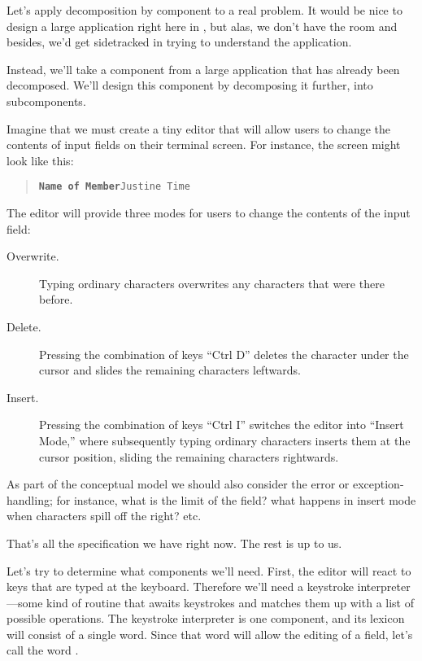 Let's apply decomposition by component to a real problem. It would be
nice to design a large application right here in , but alas, we
don't have the room and besides, we'd get sidetracked in trying to
understand the application.

Instead, we'll take a component from a large application that has
already been decomposed. We'll design this component by decomposing it
further, into subcomponents.

Imagine that we must create a tiny editor that will allow users to
change the contents of input fields on their terminal screen. For instance,
the screen might look like this:

\begin{quote}
\texttt{\textbf{Name of Member}\hspace{4em}Justine Time}
\end{quote}

The editor will provide three modes for users to change the contents of
the input field:


\begin{description}

\item[Overwrite.] Typing ordinary characters overwrites any characters
that were there before.

\item[Delete.] Pressing the combination of keys ``Ctrl D'' deletes the
character under the cursor and slides the remaining characters
leftwards.

\item[Insert.] Pressing the combination of keys ``Ctrl I'' switches the
editor into ``Insert Mode,'' where subsequently typing ordinary
characters inserts them at the cursor position, sliding the remaining
characters rightwards.

\end{description}


As part of the conceptual model we should also consider the error or
exception-handling; for instance, what is the limit of the field? what
happens in insert mode when characters spill off the right? etc.

That's all the specification we have right now. The rest is up to us.

Let's try to determine what components we'll need. First, the editor
will react to keys that are typed at the keyboard. Therefore we'll
need a keystroke interpreter---some kind of routine that awaits
keystrokes and matches them up with a list of possible operations. The
keystroke interpreter is one component, and its lexicon will consist
of a single word.  Since that word will allow the editing of a field,
let's call the word .

